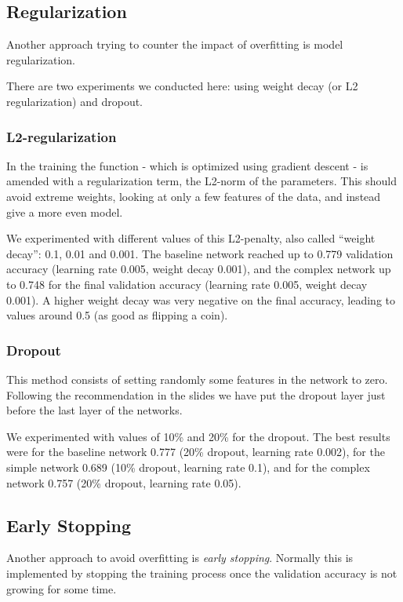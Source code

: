 \documentclass[sigconf,nonacm]{acmart}
\begin{document}
\subsection{Regularization}

Another approach trying to counter the impact of overfitting
is model regularization.

There are two experiments we conducted here:
using weight decay (or L2 regularization)
and dropout.

\subsubsection{L2-regularization}
In the training the function - which is optimized 
using gradient descent - is amended
with a regularization term, the L2-norm of the parameters.
This should avoid extreme weights, looking at only
a few features of the data, and instead give a more
even model.

We experimented with different values of this L2-penalty,
also called ``weight decay'': 0.1, 0.01 and 0.001.
The baseline network reached up to 0.779 validation
accuracy (learning rate 0.005, weight decay 0.001),
and the complex network up to 0.748 for the final
validation accuracy (learning rate 0.005, weight
decay 0.001).
A higher weight decay was very negative on the final
accuracy, leading to values around 0.5 (as good
as flipping a coin).

\subsubsection{Dropout}
This method consists
of setting randomly some features in the
network to zero.
Following the recommendation in the slides we have
put the dropout layer just before the last layer
of the networks.

We experimented with values of 10\% and 20\%
for the dropout.
The best results were for the baseline network
0.777 (20\% dropout, learning rate 0.002),
for the simple network 0.689 (10\% dropout, learning rate 0.1),
and for the complex network 0.757 (20\% dropout,
learning rate 0.05).

\subsection{Early Stopping}

Another approach to avoid overfitting is \emph{early stopping}.
Normally this is implemented by stopping the training process
once the validation accuracy is not growing for some time.
\end{document}

